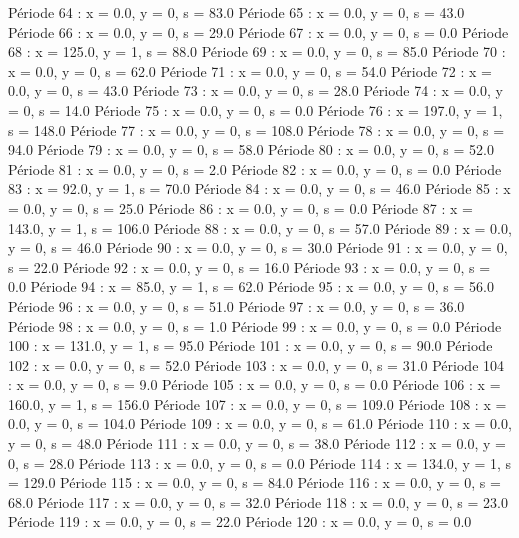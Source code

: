 Période 64 : x = 0.0, y = 0, s = 83.0
Période 65 : x = 0.0, y = 0, s = 43.0
Période 66 : x = 0.0, y = 0, s = 29.0
Période 67 : x = 0.0, y = 0, s = 0.0
Période 68 : x = 125.0, y = 1, s = 88.0
Période 69 : x = 0.0, y = 0, s = 85.0
Période 70 : x = 0.0, y = 0, s = 62.0
Période 71 : x = 0.0, y = 0, s = 54.0
Période 72 : x = 0.0, y = 0, s = 43.0
Période 73 : x = 0.0, y = 0, s = 28.0
Période 74 : x = 0.0, y = 0, s = 14.0
Période 75 : x = 0.0, y = 0, s = 0.0
Période 76 : x = 197.0, y = 1, s = 148.0
Période 77 : x = 0.0, y = 0, s = 108.0
Période 78 : x = 0.0, y = 0, s = 94.0
Période 79 : x = 0.0, y = 0, s = 58.0
Période 80 : x = 0.0, y = 0, s = 52.0
Période 81 : x = 0.0, y = 0, s = 2.0
Période 82 : x = 0.0, y = 0, s = 0.0
Période 83 : x = 92.0, y = 1, s = 70.0
Période 84 : x = 0.0, y = 0, s = 46.0
Période 85 : x = 0.0, y = 0, s = 25.0
Période 86 : x = 0.0, y = 0, s = 0.0
Période 87 : x = 143.0, y = 1, s = 106.0
Période 88 : x = 0.0, y = 0, s = 57.0
Période 89 : x = 0.0, y = 0, s = 46.0
Période 90 : x = 0.0, y = 0, s = 30.0
Période 91 : x = 0.0, y = 0, s = 22.0
Période 92 : x = 0.0, y = 0, s = 16.0
Période 93 : x = 0.0, y = 0, s = 0.0
Période 94 : x = 85.0, y = 1, s = 62.0
Période 95 : x = 0.0, y = 0, s = 56.0
Période 96 : x = 0.0, y = 0, s = 51.0
Période 97 : x = 0.0, y = 0, s = 36.0
Période 98 : x = 0.0, y = 0, s = 1.0
Période 99 : x = 0.0, y = 0, s = 0.0
Période 100 : x = 131.0, y = 1, s = 95.0
Période 101 : x = 0.0, y = 0, s = 90.0
Période 102 : x = 0.0, y = 0, s = 52.0
Période 103 : x = 0.0, y = 0, s = 31.0
Période 104 : x = 0.0, y = 0, s = 9.0
Période 105 : x = 0.0, y = 0, s = 0.0
Période 106 : x = 160.0, y = 1, s = 156.0
Période 107 : x = 0.0, y = 0, s = 109.0
Période 108 : x = 0.0, y = 0, s = 104.0
Période 109 : x = 0.0, y = 0, s = 61.0
Période 110 : x = 0.0, y = 0, s = 48.0
Période 111 : x = 0.0, y = 0, s = 38.0
Période 112 : x = 0.0, y = 0, s = 28.0
Période 113 : x = 0.0, y = 0, s = 0.0
Période 114 : x = 134.0, y = 1, s = 129.0
Période 115 : x = 0.0, y = 0, s = 84.0
Période 116 : x = 0.0, y = 0, s = 68.0
Période 117 : x = 0.0, y = 0, s = 32.0
Période 118 : x = 0.0, y = 0, s = 23.0
Période 119 : x = 0.0, y = 0, s = 22.0
Période 120 : x = 0.0, y = 0, s = 0.0


